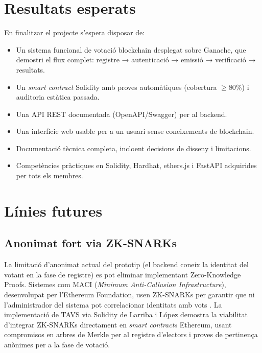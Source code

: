 \documentclass[12pt,a4paper,catalan]{article}
\begin{document}
\section{Resultats esperats}

En finalitzar el projecte s'espera disposar de:

\begin{itemize}
    \item Un sistema funcional de votació blockchain desplegat sobre Ganache, que demostri el flux complet: registre → autenticació → emissió → verificació → resultats.
    \item Un \textit{smart contract} Solidity amb proves automàtiques (cobertura $\geq$80\%) i auditoria estàtica passada.
    \item Una API REST documentada (OpenAPI/Swagger) per al backend.
    \item Una interfície web usable per a un usuari sense coneixements de blockchain.
    \item Documentació tècnica completa, incloent decisions de disseny i limitacions.
    \item Competències pràctiques en Solidity, Hardhat, ethers.js i FastAPI adquirides per tots els membres.
\end{itemize}

\appendix

\section{Línies futures}
\label{sec:futures}

\subsection{Anonimat fort via ZK-SNARKs}

La limitació d'anonimat actual del prototip (el backend coneix la identitat del votant en la fase de registre) es pot eliminar implementant Zero-Knowledge Proofs. Sistemes com MACI (\textit{Minimum Anti-Collusion Infrastructure}), desenvolupat per l'Ethereum Foundation, usen ZK-SNARKs per garantir que ni l'administrador del sistema pot correlacionar identitats amb vots \cite{ethereum_zkp}. La implementació de TAVS via Solidity de Larriba i López \cite{larriba2023} demostra la viabilitat d'integrar ZK-SNARKs directament en \textit{smart contracts} Ethereum, usant compromisos en arbres de Merkle per al registre d'electors i proves de pertinença anònimes per a la fase de votació.
\end{document}
